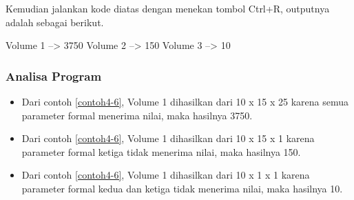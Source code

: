 Kemudian jalankan kode diatas dengan menekan tombol Ctrl+R, outputnya
adalah sebagai berikut.
\begin{lcverbatim}
Volume 1 --> 3750
Volume 2 --> 150
Volume 3 --> 10
\end{lcverbatim}


\subsubsection*{Analisa Program}

\begin{itemize}

\item
 Dari contoh \ref{contoh4-6}, Volume 1 dihasilkan dari 10 x 15 x 25 karena
 semua parameter formal menerima nilai, maka hasilnya 3750.
\item
 Dari contoh \ref{contoh4-6}, Volume 1 dihasilkan dari 10 x 15 x 1 karena
 parameter formal ketiga tidak menerima nilai, maka hasilnya 150.
\item
 Dari contoh \ref{contoh4-6}, Volume 1 dihasilkan dari 10 x 1 x 1 karena
 parameter formal kedua dan ketiga tidak menerima nilai, maka hasilnya
 10.
\end{itemize}
